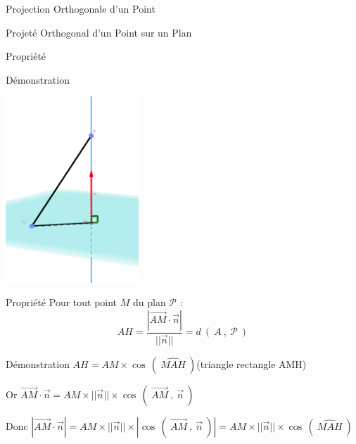 \documentclass{cours}
\begin{document}
\begin{Gpartie}{Projection Orthogonale d'un Point}
\begin{Spartie}{Projeté Orthogonal d'un Point sur un Plan}
\begin{SSSpartie}{Propriété}
\begin{SSSSpartie}{Démonstration}
                    \begin{center}
                        \includegraphics[width=5cm]{rsc/12fig9.png}
                        \parbox{\linewidth}{}
                    \end{center}    
                \end{SSSSpartie}
            \end{SSSpartie}
            \begin{SSSpartie}{Propriété} 
                Pour tout point $M$ du plan $\mathcal{P}$ : \[AH=\frac{\left\lvert\overrightarrow{AM}\cdot\vec{n}\right\rvert}{\lvert\lvert\vec{n}\rvert\rvert}=d~\left(~A~,~\mathcal{P}~\right)\]
                \begin{SSSSpartie}{Démonstration} 
                    $AH=AM\times\cos\,\left(~\widehat{MAH}~\right)$\quad (triangle rectangle AMH)

                    Or $\overrightarrow{AM}\cdot\vec{n}=AM\times\lvert\lvert\vec{n}\rvert\rvert\times\cos\,\left(~\overrightarrow{AM}~,~\vec{n}~\right)$

                    Donc $\left\lvert\overrightarrow{AM}\cdot\vec{n}\right\rvert=AM\times\lvert\lvert\vec{n}\rvert\rvert\times\left\lvert\cos\,\left(~\overrightarrow{AM}~,~\vec{n}~\right)\right\rvert=AM\times\lvert\lvert\vec{n}\rvert\rvert\times\cos\,\left(~\widehat{MAH}~\right)$


\end{SSSSpartie}
\end{SSSpartie}
\end{Spartie}
\end{Gpartie}
\end{document}
